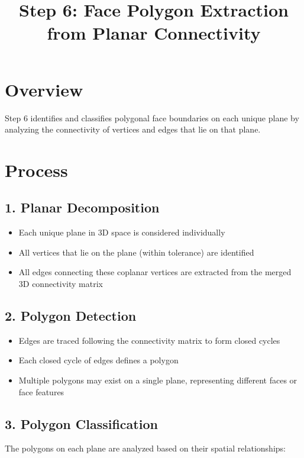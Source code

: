 \documentclass[11pt,a4paper]{article}
\title{Step 6: Face Polygon Extraction from Planar Connectivity}
\author{}
\date{}
\begin{document}
\maketitle

\section{Overview}

Step 6 identifies and classifies polygonal face boundaries on each unique plane by analyzing the connectivity of vertices and edges that lie on that plane.

\section{Process}

\subsection{1. Planar Decomposition}

\begin{itemize}
    \item Each unique plane in 3D space is considered individually
    \item All vertices that lie on the plane (within tolerance) are identified
    \item All edges connecting these coplanar vertices are extracted from the merged 3D connectivity matrix
\end{itemize}

\subsection{2. Polygon Detection}

\begin{itemize}
    \item Edges are traced following the connectivity matrix to form closed cycles
    \item Each closed cycle of edges defines a polygon
    \item Multiple polygons may exist on a single plane, representing different faces or face features
\end{itemize}

\subsection{3. Polygon Classification}

The polygons on each plane are analyzed based on their spatial relationships:
\end{document}
